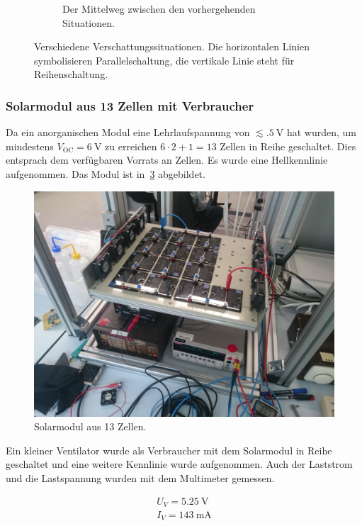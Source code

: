 \documentclass[slug=SZ, room=Hermann-Krone-Bau\,\ Labor\ 1.25,
supervisor=Martin\ Kroll, coursedate=14.\ 11.\ 2019]{../../Lab_Report_LaTeX/lab_report}
\newcommand{\voc}{V_{\text{OC}}}
\begin{document}
\begin{figure}[h!]
\begin{subfigure}[b]{.3\textwidth}
    \caption{Der Mittelweg zwischen den vorhergehenden Situationen.}
    \label{fig:schatt3}
  \end{subfigure}
  \caption{Verschiedene Verschattungssituationen. Die horizontalen
    Linien symbolisieren Parallelschaltung, die vertikale Linie steht
    f\"ur Reihenschaltung.}
  \label{fig:modverschatt}
\end{figure}

\subsubsection{Solarmodul aus 13 Zellen mit Verbraucher}
\label{sec:bigmodule}

Da ein anorganischen Modul eine Lehrlaufspannung von
\(\lesssim\SI{.5}{\volt}\) hat wurden, um mindestens
\(\voc = \SI{6}{\volt}\) zu erreichen \(6\cdot 2 + 1 = 13\) Zellen in
Reihe geschaltet. Dies entsprach dem verf\"ugbaren
Vorrats an Zellen. Es wurde eine Hellkennlinie
aufgenommen. Das Modul ist in~\ref{fig:p:13_cell} abgebildet.

\begin{figure}[h!]\centering
 \includegraphics[width=.5\columnwidth]{diagrams/photos/13_cell.jpg}
 \caption{Solarmodul aus 13 Zellen.}
 \label{fig:p:13_cell}
\end{figure}

Ein kleiner Ventilator wurde als
Verbraucher mit dem Solarmodul in Reihe geschaltet und eine weitere
Kennlinie wurde aufgenommen. Auch der Laststrom und die Lastspannung
wurden mit dem Multimeter gemessen.

\begin{align}
  \label{eq:last}
  U_V = \SI{5.25}{\volt}\\
  I_V = \SI{143}{\milli\ampere}
\end{align}
\end{document}
